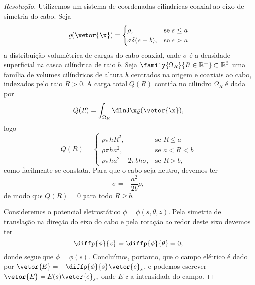 \begin{proof}[Resolução]
    Utilizemos um sistema de coordenadas cilíndricas coaxial ao eixo de simetria do cabo. Seja
    \begin{equation*}
        \varrho(\vetor{\x}) = \begin{cases}
            \rho,&\text{se }s \leq a\\
            \sigma \delta(s - b),&\text{se }s > a
        \end{cases}
    \end{equation*}
    a distribuição volumétrica de cargas do cabo coaxial, onde \(\sigma\) é a densidade superficial na casca cilíndrica de raio \(b\). Seja \(\family{\Omega_R}{R \in \mathbb{R}^+} \subset \mathbb{R}^3\) uma família de volumes cilíndricos de altura \(h\) centrados na origem e coaxiais ao cabo, indexados pelo raio \(R > 0\). A carga total \(Q(R)\) contida no cilindro \(\Omega_R\) é dada por
    \begin{align*}
        Q(R) = \int_{\Omega_R}\dln3\x \varrho(\vetor{\x}),
    \end{align*}
    logo
    \begin{equation*}
        Q(R) = \begin{cases}
            \rho \pi h R^2, &\text{se }R \leq a\\
            \rho \pi h a^2, &\text{se }a < R < b\\
            \rho \pi h a^2 + 2 \pi b h\sigma, &\text{se }R > b,
        \end{cases}
    \end{equation*}
    como facilmente se constata. Para que o cabo seja neutro, devemos ter
    \begin{equation*}
        \sigma = -\frac{a^2}{2b}\rho,
    \end{equation*}
    de modo que \(Q(R) = 0\) para todo \(R \geq b\).

    Consideremos o potencial eletrostático \(\phi = \phi(s, \theta, z)\). Pela simetria de translação na direção do eixo do cabo e pela rotação ao redor deste eixo devemos ter
    \begin{equation*}
        \diffp{\phi}{z} = \diffp{\phi}{\theta} = 0,
    \end{equation*}
    donde segue que \(\phi = \phi(s)\). Concluímos, portanto, que o campo elétrico é dado por \(\vetor{E} = -\diffp{\phi}{s} \vetor{e}_s\), e podemos escrever \(\vetor{E} = E(s) \vetor{e}_s,\) onde \(E\) é a intensidade do campo.


\end{proof}
